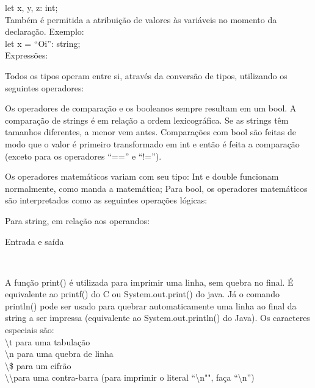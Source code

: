 \documentclass[12pt,a4paper]{article}
\begin{document}
let x, y, z: int;\\

Também é permitida a atribuição de valores às variáveis no momento da declaração. Exemplo:\\

let x = ``Oi'': string;\\


Expressões:

Todos os tipos operam entre si, através da conversão de tipos, utilizando os seguintes operadores:


Os operadores de comparação e os booleanos sempre resultam em um bool. A comparação de strings é em relação a ordem lexicográfica. Se as strings têm tamanhos diferentes, a menor vem antes. Comparações com bool são feitas de modo que o valor é primeiro transformado em int e então é feita a comparação (exceto para os operadores ``=='' e ``!='').

Os operadores matemáticos variam com seu tipo:
Int e double funcionam normalmente, como manda a matemática;
Para bool, os operadores matemáticos são interpretados como as seguintes operações lógicas:

Para string, em relação aos operandos:

\hypertarget{Entrada e saída}{\Large{Entrada e saída}}\\[0.3cm]
\normalsize

A função print() é utilizada para imprimir uma linha, sem quebra no final. É equivalente ao printf() do C ou System.out.print() do java. Já o comando println() pode ser usado para quebrar automaticamente uma linha ao final da string a ser impressa (equivalente ao System.out.println() do Java). Os caracteres especiais são:\\[0.2cm]
\textbackslash t para uma tabulação \\
\textbackslash n para uma quebra de linha \\
\textbackslash \$ para um cifrão \\
\textbackslash \textbackslash para uma contra-barra (para imprimir o literal ``\textbackslash n"", faça ``\textbackslash n'') \\
\end{document}
